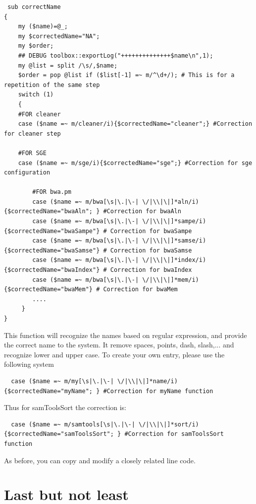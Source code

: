 \documentclass[a4paper,10pt]{report}
\begin{document}
\begin{lstlisting}
 sub correctName
{
    my ($name)=@_;
    my $correctedName="NA";
    my $order;
    ## DEBUG toolbox::exportLog("++++++++++++++$name\n",1);
    my @list = split /\s/,$name;
    $order = pop @list if ($list[-1] =~ m/^\d+/); # This is for a repetition of the same step
    switch (1)
    {
	#FOR cleaner
	case ($name =~ m/cleaner/i){$correctedName="cleaner";} #Correction for cleaner step
	
	#FOR SGE
	case ($name =~ m/sge/i){$correctedName="sge";} #Correction for sge configuration
	
        #FOR bwa.pm
        case ($name =~ m/bwa[\s|\.|\-| \/|\\|\|]*aln/i){$correctedName="bwaAln"; } #Correction for bwaAln
        case ($name =~ m/bwa[\s|\.|\-| \/|\\|\|]*sampe/i){$correctedName="bwaSampe"} # Correction for bwaSampe
        case ($name =~ m/bwa[\s|\.|\-| \/|\\|\|]*samse/i){$correctedName="bwaSamse"} # Correction for bwaSamse
        case ($name =~ m/bwa[\s|\.|\-| \/|\\|\|]*index/i){$correctedName="bwaIndex"} # Correction for bwaIndex
        case ($name =~ m/bwa[\s|\.|\-| \/|\\|\|]*mem/i){$correctedName="bwaMem"} # Correction for bwaMem
        ....
     }
}
\end{lstlisting}

This function will recognize the names based on regular expression, and provide the correct name to the system. It remove spaces, points, dash, slash,... and recognize lower and upper case.
To create your own entry, please use the following system

\begin{lstlisting}
  case ($name =~ m/my[\s|\.|\-| \/|\\|\|]*name/i){$correctedName="myName"; } #Correction for myName function
\end{lstlisting}

Thus for samToolsSort the correction is:
\begin{lstlisting}
  case ($name =~ m/samtools[\s|\.|\-| \/|\\|\|]*sort/i){$correctedName="samToolsSort"; } #Correction for samToolsSort function
\end{lstlisting}

As before, you can copy and modify a closely related line code.

\section{Last but not least}
\end{document}
